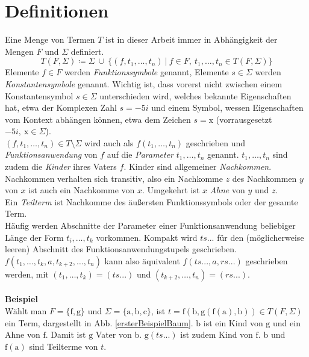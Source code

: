 \documentclass{article}
\begin{document}
\section{Definitionen}
Eine Menge von Termen $T$ ist in dieser Arbeit immer  in Abhängigkeit der Mengen $F$ und $\Sigma$ definiert.
$$T(F, \Sigma) \coloneqq \Sigma ~\cup~ \{
(f, t_1, \dots, t_n)
~|
~f\in F,
~ t_1, \dots,t_n \in T(F, \Sigma)
\}$$ 
Elemente $f\in F$ werden \textit{Funktionssymbole} genannt, Elemente $s \in \Sigma$ werden \textit{Konstantensymbole} genannt.
Wichtig ist, dass vorerst nicht zwischen einem Konstantensymbol $s \in \Sigma$ unterschieden wird, welches bekannte Eigenschaften hat, etwa der Komplexen Zahl $s = -5i$ und einem Symbol, wessen Eigenschaften vom Kontext abhängen können, etwa dem Zeichen $s = \mathrm x$ (vorrausgesetzt $-5i,~\mathrm x \in \Sigma$). \\
 $(f, t_1, \dots, t_n) \in T \setminus \Sigma$ wird auch als $f(t_1, \dots, t_n)$ geschrieben und \textit{Funktionsanwendung} von $f$ auf die \textit{Parameter} $t_1, \dots, t_n$ genannt. $t_1, \dots, t_n$ sind zudem die \emph{Kinder} ihres Vaters $f$. Kinder sind allgemeiner \textit{Nachkommen}. Nachkommen verhalten sich transitiv, also ein Nachkomme $z$ des Nachkommen $y$ von $x$ ist auch ein Nachkomme von $x$. Umgekehrt ist $x$ \textit{Ahne} von $y$ und $z$. \\
Ein \textit{Teilterm} ist Nachkomme des äußersten Funktionssymbols oder der gesamte Term. \\
Häufig werden Abschnitte der Parameter einer Funktionsanwendung beliebiger Länge der Form $t_i, \dots, t_k$ vorkommen. Kompakt wird $ts...$ für den (möglicherweise leeren) Abschnitt des Funktionsanwendungstupels geschrieben. \\$f(t_1, \dots, t_k, a, t_{k+2}, \dots, t_n)$ kann also äquivalent $f(ts..., a, rs...)$ geschrieben werden, mit $(t_1, \dots, t_k) = (ts...)$ und $(t_{k+2}, \dots, t_n) = (rs...)$.\\~\\


\textbf{Beispiel}\\
Wählt man $F = \{\mathrm f, \mathrm g\}$ und $\Sigma = \{\mathrm a, \mathrm b, \mathrm c\}$, ist 
$t = \mathrm f(\mathrm b, \mathrm g(\mathrm f(\mathrm a), \mathrm b)) \in T(F, \Sigma)$ ein Term, dargestellt in Abb. \ref{ersterBeispielBaum}. $\mathrm b$ ist ein Kind von $\mathrm g$ und ein Ahne von $\mathrm f$. Damit ist $\mathrm g$ Vater von $\mathrm b$. $\mathrm g(ts...)$ ist zudem Kind von $\mathrm f$. $\mathrm b$ und $\mathrm f(\mathrm a)$ sind Teilterme von $t$.
\end{document}
